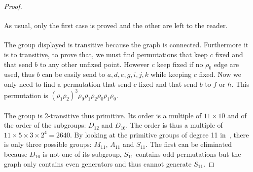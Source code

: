 \begin{proof}
\begin{figure}[H]
\begin{center}
      \caption{}
    \end{center}
  \end{figure}

  \paragraph{}
  As usual, only the first case is proved and the other are left to the reader.

  \paragraph{}
  The group displayed is transitive because the graph is connected. Furthermore it is to transitive, to prove that, we must find permutations that keep $c$ fixed and that send $b$ to any other unfixed point. However $c$ keep fixed if no $\rho_0$ edge are used, thus $b$ can be easily send to $a,d,e,g,i,j,k$ while keeping $c$ fixed. Now we only need to find a permutation that send $c$ fixed and that send $b$ to $f$ or $h$. This permutation is $(\rho_1\rho_2)^3\rho_0\rho_1\rho_2\rho_0\rho_1\rho_0$.

  \paragraph{}
  The group is 2-transitive thus primitive. Its order is a multiple of $11 \times 10$ and of the order of the subgroups: $D_{12}$ and $D_{16}$. The order is thus a multiple of $11 \times 5 \times 3 \times 2^4 = 2640$. By looking at the primitive groups of degree 11 in~\cite{buekenhout1996list}, there is only three possible groups: $M_{11}$, $A_{11}$ and $S_{11}$. The first can be eliminated because $D_{16}$ is not one of its subgroup, $S_{11}$ contains odd permutations but the graph only contains even generators and thus cannot generate $S_{11}$.


\end{proof}
